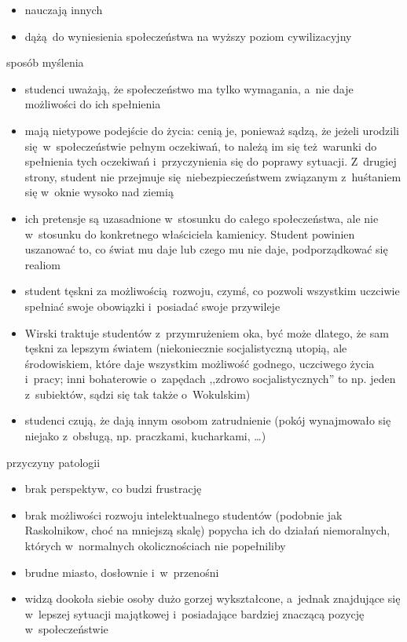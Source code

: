 \begin{description}
\begin{itemize}
\begin{itemize}
                    \item nauczają innych
                    \item dążą do wyniesienia społeczeństwa na wyższy poziom cywilizacyjny
                \end{itemize}
        \end{itemize}
    \item sposób myślenia
        \begin{itemize}
            \item studenci uważają, że społeczeństwo ma tylko wymagania, a~nie daje możliwości do ich spełnienia
            \item mają nietypowe podejście do życia: cenią je, ponieważ sądzą, że jeżeli urodzili się w~społeczeństwie pełnym oczekiwań, to należą im się też warunki do spełnienia tych oczekiwań i~przyczynienia się do poprawy sytuacji. Z~drugiej strony, student nie przejmuje się niebezpieczeństwem związanym z~huśtaniem się w~oknie wysoko nad ziemią
            \item ich pretensje są uzasadnione w~stosunku do całego społeczeństwa, ale nie w~stosunku do konkretnego właściciela kamienicy. Student powinien uszanować to, co świat mu daje lub czego mu nie daje, podporządkować się realiom
            \item student tęskni za możliwością rozwoju, czymś, co pozwoli wszystkim uczciwie spełniać swoje obowiązki i~posiadać swoje przywileje
            \item Wirski traktuje studentów z~przymrużeniem oka, być może dlatego, że sam tęskni za lepszym światem (niekoniecznie socjalistyczną utopią, ale środowiskiem, które daje wszystkim możliwość godnego, uczciwego życia i~pracy; inni bohaterowie o~zapędach ,,zdrowo socjalistycznych'' to np. jeden z~subiektów, sądzi się tak także o~Wokulskim)
            \item studenci czują, że dają innym osobom zatrudnienie (pokój wynajmowało się niejako z~obsługą, np. praczkami, kucharkami, \ldots)
        \end{itemize}
    \item przyczyny patologii
        \begin{itemize}
            \item brak perspektyw, co budzi frustrację
            \item brak możliwości rozwoju intelektualnego studentów (podobnie jak Raskolnikow, choć na mniejszą skalę) popycha ich do działań niemoralnych, których w~normalnych okolicznościach nie popełniliby
            \item brudne miasto, dosłownie i~w~przenośni
            \item widzą dookoła siebie osoby dużo gorzej wykształcone, a~jednak znajdujące się w~lepszej sytuacji majątkowej i~posiadające bardziej znaczącą pozycję w~społeczeństwie
        \end{itemize}
\end{description}
